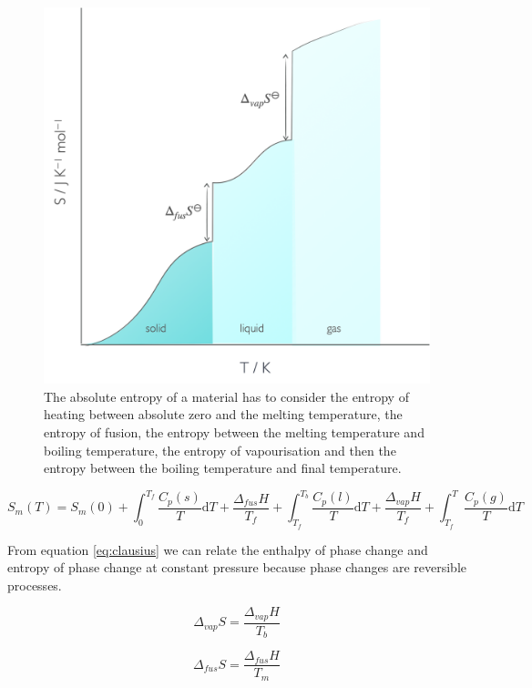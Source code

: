 \documentclass[
]{book}
\begin{document}
\begin{figure}

{\centering \includegraphics[width=0.8\linewidth]{images/entropyphase} 

}

\caption{The absolute entropy of a material has to consider the entropy of heating between absolute zero and the melting temperature, the entropy of fusion, the entropy between the melting temperature and boiling temperature, the entropy of vapourisation and then the entropy between the boiling temperature and final temperature.}\label{fig:entropyphase}
\end{figure}

\begin{equation}
S_m(T) = S_m(0)+ \int_0^{T_f}\frac{C_p(s)}{T}\textrm{d}T+ \frac{\Delta _{fus} H}{T_f}+ \int_{T_f}^{T_b}\frac{C_p(l)}{T}\textrm{d}T+ \frac{\Delta _{vap} H}{T_f}+ \int_{T_f}^T\frac{C_p(g)}{T}\textrm{d}T
\label{eq:entropyphase}
\end{equation}

From equation \eqref{eq:clausius} we can relate the enthalpy of phase change and entropy of phase change at constant pressure because phase changes are reversible processes.

\begin{equation}
\Delta_{vap} S=\frac{\Delta_{vap} H }{T_b}
\label{eq:entropyvap}
\end{equation}

\begin{equation}
\Delta_{fus} S=\frac{\Delta_{fus} H }{T_m}
\label{eq:entropyfus}
\end{equation}
\end{document}
